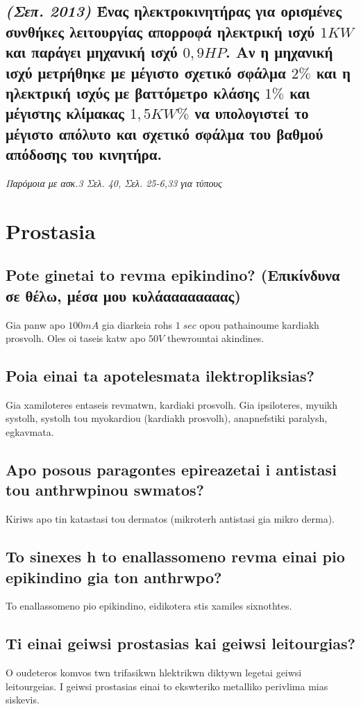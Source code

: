 \documentclass{article}
\begin{document}
\subsection{\emph{(Σεπ. 2013)} Ένας ηλεκτροκινητήρας για ορισμένες συνθήκες λειτουργίας απορροφά ηλεκτρική ισχύ $1KW$ και παράγει μηχανική ισχύ $0,9HP$. Αν η μηχανική ισχύ μετρήθηκε με μέγιστο σχετικό σφάλμα $2\%$ και η ηλεκτρική ισχύς με βαττόμετρο κλάσης $1\%$ και μέγιστης κλίμακας $1,5KW\%$ να υπολογιστεί το μέγιστο απόλυτο και σχετικό σφάλμα του βαθμού απόδοσης του κινητήρα.}

\emph{Παρόμοια με ασκ.3 Σελ. 40, Σελ. 25-6,33 για τύπους}

\section{Prostasia}
\subsection{Pote ginetai to revma epikindino? (Επικίνδυνα σε θέλω, μέσα μου κυλάαααααααας)}
Gia panw apo $100mA$ gia diarkeia rohs $1\;sec$ opou pathainoume kardiakh prosvolh. Oles oi taseis katw apo $50V$ thewrountai akindines.

\subsection{Poia einai ta apotelesmata ilektropliksias?}
Gia xamiloteres entaseis revmatwn, kardiaki prosvolh. Gia ipsiloteres, myuikh systolh, systolh tou myokardiou (kardiakh prosvolh), anapnefstiki paralysh, egkavmata.

\subsection{Apo posous paragontes epireazetai i antistasi tou anthrwpinou swmatos?}
Kiriws apo tin katastasi tou dermatos (mikroterh antistasi gia mikro derma).

\subsection{To sinexes h to enallassomeno revma einai pio epikindino gia ton anthrwpo?}
To enallassomeno pio epikindino, eidikotera stis xamiles sixnothtes.

\subsection{Ti einai geiwsi prostasias kai geiwsi leitourgias?}
O oudeteros komvos twn trifasikwn hlektrikwn diktywn legetai geiwsi leitourgeias. I geiwsi prostasias einai to ekswteriko metalliko perivlima mias siskevis.
\end{document}
